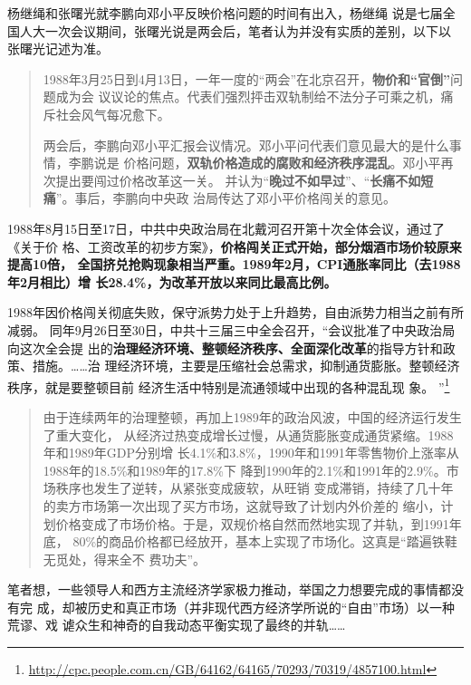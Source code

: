 杨继绳\cite{yangshuanggui}和张曙光就李鹏向邓小平反映价格问题的时间有出入，杨继绳
说是七届全国人大一次会议期间，张曙光说是两会后，笔者认为并没有实质的差别，以下以
张曙光记述为准。
\begin{quotation}
  1988年3月25日到4月13日，一年一度的“两会”在北京召开，\textbf{物价和“官倒”}问题成为会
  议议论的焦点。代表们强烈抨击双轨制给不法分子可乘之机，痛斥社会风气每况愈下。

  两会后，李鹏向邓小平汇报会议情况。邓小平问代表们意见最大的是什么事情，李鹏说是
  价格问题，\textbf{双轨价格造成的腐败和经济秩序混乱}。邓小平再次提出要闯过价格改革这一关。
  并认为“\textbf{晚过不如早过}”、“\textbf{长痛不如短痛}”。事后，李鹏向中央政
  治局传达了邓小平价格闯关的意见。
\end{quotation}

1988年8月15日至17日，中共中央政治局在北戴河召开第十次全体会议，通过了《关于价
格、工资改革的初步方案》，\textbf{价格闯关正式开始，部分烟酒市场价较原来提高10倍，
  全国挤兑抢购现象相当严重。1989年2月，CPI通胀率同比（去1988年2月相比）增
  长28.4\%，为改革开放以来同比最高比例。}

1988年因价格闯关彻底失败，保守派势力处于上升趋势，自由派势力相当之前有所减弱。
同年9月26日至30日，中共十三届三中全会召开，“会议批准了中央政治局向这次全会提
出的\textbf{治理经济环境、整顿经济秩序、全面深化改革}的指导方针和政策、措施。……治
理经济环境，主要是压缩社会总需求，抑制通货膨胀。整顿经济秩序，就是要整顿目前
经济生活中特别是流通领域中出现的各种混乱现
象。
”\footnote{\url{http://cpc.people.com.cn/GB/64162/64165/70293/70319/4857100.html}}

\begin{quotation}
  由于连续两年的治理整顿，再加上1989年的政治风波，中国的经济运行发生了重大变化，
  从经济过热变成增长过慢，从通货膨胀变成通货紧缩。1988年和1989年GDP分别增
  长4.1\%和3.8\%，1990年和1991年零售物价上涨率从1988年的18.5\%和1989年的17.8\%下
  降到1990年的2.1\%和1991年的2.9\%。市场秩序也发生了逆转，从紧张变成疲软，从旺销
  变成滞销，持续了几十年的卖方市场第一次出现了买方市场，这就导致了计划内外价差的
  缩小，计划价格变成了市场价格。于是，双规价格自然而然地实现了并轨，到1991年底，
  80\%的商品价格都已经放开，基本上实现了市场化。这真是“踏遍铁鞋无觅处，得来全不
  费功夫”。
\end{quotation}

笔者想，一些领导人和西方主流经济学家极力推动，举国之力想要完成的事情都没有完
成，却被历史和真正市场（并非现代西方经济学所说的“自由”市场）以一种荒谬、戏
谑众生和神奇的自我动态平衡实现了最终的并轨……


